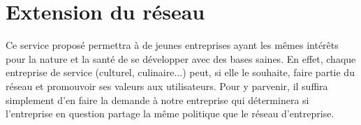 
\section{Extension du réseau}

Ce service proposé permettra à de jeunes entreprises ayant les mêmes intérêts pour la nature et la santé de se développer avec des bases saines.
En effet, chaque entreprise de service (culturel, culinaire...) peut, si elle le souhaite, faire partie du réseau et promouvoir ses valeurs aux utilisateurs. \n
Pour y parvenir, il suffira simplement d'en faire la demande à notre entreprise qui déterminera si l'entreprise en question partage la même politique que le réseau d'entreprise.